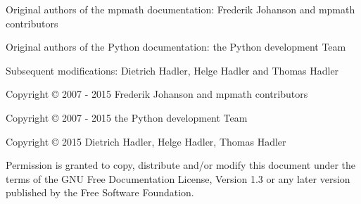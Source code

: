 \small
\noindent 
Original authors of the mpmath documentation: Frederik Johanson and mpmath contributors

\noindent 
Original authors of the Python documentation: the Python development Team


\noindent 
Subsequent modifications: Dietrich Hadler, Helge Hadler and Thomas Hadler




\vspace{19cm}


 

\noindent
Copyright \copyright \hspace{0.5mm}  2007 - 2015 Frederik Johanson and mpmath contributors

\noindent
Copyright \copyright \hspace{0.5mm}  2007 - 2015 the Python development Team


\noindent
Copyright \copyright \hspace{0.5mm}  2015 Dietrich Hadler, Helge Hadler, Thomas Hadler

\vspace{1cm}

\noindent
Permission is granted to copy, distribute and/or modify this document under the terms of the GNU Free Documentation License, Version 1.3 or any later version published by the Free Software Foundation. 
\normalsize